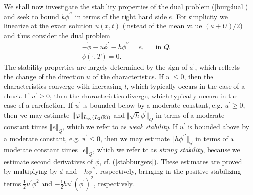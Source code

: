 We shall now investigate the stability properties of the dual problem
(\ref{burgdual}) and seek to bound 
$h\phi^{\prime\prime}$ in terms of the right hand side
$e$. For simplicity we linearize at the exact solution 
$u(x,t)$ (instead of the mean value
$(u+U)/2$) and thus consider the dual problem
\begin{equation}\label{burgdual1}
\begin{array}{rcl}
 -\dot\phi - 
u\phi^\prime -
h\phi^{\prime\prime}  =  e, & & \mbox{in } Q,\\
\phi (\cdot ,T)  =  0.
\end{array}
\end{equation}
The stability properties are largely determined by the sign of $u^\prime$,
which reflects the change of the direction $u$ of the characteristics. If
$u^\prime \le 0$, then the characteristics converge with increasing $t$,
which typically occurs in the case of a shock. If $u^\prime \ge 0$,
then the characteristics diverge, which typically occurs in the
case of a rarefaction. If $u^\prime $ is bounded below by a moderate
constant, e.g. $u^\prime\ge 0 $,  then we may
estimate $\Vert \varphi\Vert_{L_\infty (L_2({\mathbb{R}} ))}$ and
$\Vert\sqrt{h}\phi^\prime\Vert_Q$  in terms of a moderate constant
times $\Vert e\Vert_{Q}$, which we refer to as 
{\it weak stability}. 
If $u^\prime$ is bounded above by a moderate constant, 
e.g. $u^\prime\le 0$, 
then we may estimate $\Vert h\phi^{\prime\prime}\Vert_{Q}$ in terms of
a moderate constant times $\Vert e\Vert_{Q}$, which we refer to as {\it strong stability},
because we estimate second derivatives of $\phi$, cf. (\ref{stabburgers}). 
These estimates are proved by multiplying by $\phi$ and 
$-h\phi^{\prime\prime}$, respectively,
bringing in the positive stabilizing terms 
$\frac{1}{2}u^\prime \phi^2$ and $-\frac{1}{2}h u^\prime (\phi^\prime )^2$,
respectively.

